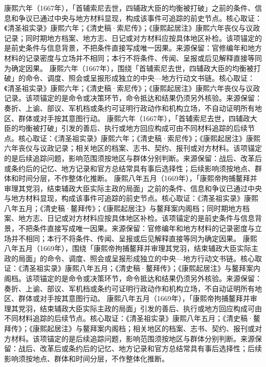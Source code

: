 康熙六年（1667年），「首辅索尼去世，四辅政大臣的均衡被打破」之前的条件、信息和争议已通过中央与地方材料显现，构成该事件可追踪的前史节点。核心取证：《清圣祖实录》康熙六年；《清史稿·索尼传》；《康熙起居注》康熙六年丧仪与议政记录；同时期地方档案、地方志、日记或对方材料应按具体地区补检。该项锚定的是前史条件与信息背景，不把条件直接写成唯一因果。来源保留：官修编年和地方材料的记录密度与立场并不相同；本行不将条件、传闻、呈报或后见解释直接等同为确定因果。
康熙六年（1667年），围绕「首辅索尼去世，四辅政大臣的均衡被打破」的命令、调度、照会或呈报形成独立的中央—地方行动文书链。核心取证：《清圣祖实录》康熙六年；《清史稿·索尼传》；《康熙起居注》康熙六年丧仪与议政记录。该项锚定的是命令或决策环节，命令抵达和结果仍须另外核验。来源保留：奏折、上谕、部议、军机档或条约可证明行政动作和机构立场，不自动证明所有地区、群体或对手按其意图行动。
康熙六年（1667年），「首辅索尼去世，四辅政大臣的均衡被打破」引发的善后、执行或地方回应构成可由不同材料追踪的后续节点。核心取证：《清圣祖实录》康熙六年；《清史稿·索尼传》；《康熙起居注》康熙六年丧仪与议政记录；相关地区的档案、志书、契约、报刊或对方材料。该项锚定的是后续追踪问题，影响范围须按地区与群体分别判断。来源保留：战后、改革后或条约后的记忆、地方记录和官方总结常具有事后选择性；后续影响须按地点、群体和时间分层，不作整体化推断。
康熙八年五月（1669年），「康熙帝拘捕鳌拜并审理其党羽，结束辅政大臣实际主政的局面」之前的条件、信息和争议已通过中央与地方材料显现，构成该事件可追踪的前史节点。核心取证：《清圣祖实录》康熙八年五月；《清史稿·鳌拜传》；《康熙起居注》与鳌拜案内阁档；同时期地方档案、地方志、日记或对方材料应按具体地区补检。该项锚定的是前史条件与信息背景，不把条件直接写成唯一因果。来源保留：官修编年和地方材料的记录密度与立场并不相同；本行不将条件、传闻、呈报或后见解释直接等同为确定因果。
康熙八年五月（1669年），围绕「康熙帝拘捕鳌拜并审理其党羽，结束辅政大臣实际主政的局面」的命令、调度、照会或呈报形成独立的中央—地方行动文书链。核心取证：《清圣祖实录》康熙八年五月；《清史稿·鳌拜传》；《康熙起居注》与鳌拜案内阁档。该项锚定的是命令或决策环节，命令抵达和结果仍须另外核验。来源保留：奏折、上谕、部议、军机档或条约可证明行政动作和机构立场，不自动证明所有地区、群体或对手按其意图行动。
康熙八年五月（1669年），「康熙帝拘捕鳌拜并审理其党羽，结束辅政大臣实际主政的局面」引发的善后、执行或地方回应构成可由不同材料追踪的后续节点。核心取证：《清圣祖实录》康熙八年五月；《清史稿·鳌拜传》；《康熙起居注》与鳌拜案内阁档；相关地区的档案、志书、契约、报刊或对方材料。该项锚定的是后续追踪问题，影响范围须按地区与群体分别判断。来源保留：战后、改革后或条约后的记忆、地方记录和官方总结常具有事后选择性；后续影响须按地点、群体和时间分层，不作整体化推断。
